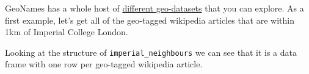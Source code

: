 \documentclass[
  letterpaper,
  DIV=11,
  numbers=noendperiod]{scrreprt}
\newenvironment{Shaded}{\begin{snugshade}}{\end{snugshade}}
\newcommand{\AttributeTok}[1]{\textcolor[rgb]{0.40,0.45,0.13}{#1}}
\newcommand{\CommentTok}[1]{\textcolor[rgb]{0.37,0.37,0.37}{#1}}
\newcommand{\DecValTok}[1]{\textcolor[rgb]{0.68,0.00,0.00}{#1}}
\newcommand{\FloatTok}[1]{\textcolor[rgb]{0.68,0.00,0.00}{#1}}
\newcommand{\FunctionTok}[1]{\textcolor[rgb]{0.28,0.35,0.67}{#1}}
\newcommand{\NormalTok}[1]{\textcolor[rgb]{0.00,0.23,0.31}{#1}}
\newcommand{\OtherTok}[1]{\textcolor[rgb]{0.00,0.23,0.31}{#1}}
\newcommand{\SpecialCharTok}[1]{\textcolor[rgb]{0.37,0.37,0.37}{#1}}
\newcommand{\StringTok}[1]{\textcolor[rgb]{0.13,0.47,0.30}{#1}}
\begin{document}
GeoNames has a whole host of
\href{http://www.geonames.org/export/ws-overview.html}{different
geo-datasets} that you can explore. As a first example, let's get all of
the geo-tagged wikipedia articles that are within 1km of Imperial
College London.

\begin{Shaded}
\end{Shaded}

Looking at the structure of \texttt{imperial\_neighbours} we can see
that it is a data frame with one row per geo-tagged wikipedia article.
\end{document}
